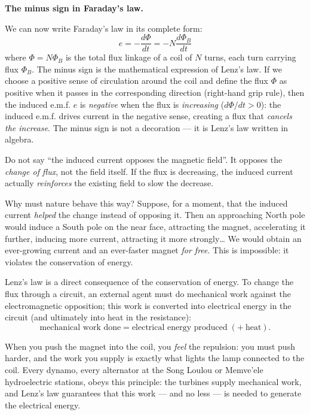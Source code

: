 \documentclass[11pt]{article}
\newcommand{\cle}[1]{{\popxbold\color{popdark}#1}}
\newcounter{popsec}
\newcounter{popsub}
\newcommand{\courssub}[1]{%
  \stepcounter{popsub}%
  \par\vspace{9pt}\noindent{\popxbold\fontsize{11.5}{13}\selectfont\color{popink}{\color{poporange}\thepopsec.\thepopsub}\hspace{6pt}#1}\par\nopagebreak\vspace{4pt}
}
\begin{document}
\textbf{The minus sign in Faraday's law.}\par

We can now write Faraday's law in its complete form:
\[
e = -\frac{d\Phi}{dt} = -N\frac{d\Phi_B}{dt}
\]
where $\Phi = N\Phi_B$ is the total flux linkage of a coil of $N$ turns, each turn carrying flux $\Phi_B$. The \cle{minus sign} is the mathematical expression of Lenz's law. If we choose a positive sense of circulation around the coil and define the flux $\Phi$ as positive when it passes in the corresponding direction (right-hand grip rule), then the induced e.m.f. $e$ is \emph{negative} when the flux is \emph{increasing} ($d\Phi/dt > 0$): the induced e.m.f. drives current in the negative sense, creating a flux that \emph{cancels the increase}. The minus sign is not a decoration --- it is Lenz's law written in algebra.

\begin{attention}
Do not say ``the induced current opposes the magnetic field''. It opposes the \emph{change of flux}, not the field itself. If the flux is decreasing, the induced current actually \emph{reinforces} the existing field to slow the decrease.
\end{attention}

\courssub{Lenz's Law and the Conservation of Energy}

Why must nature behave this way? Suppose, for a moment, that the induced current \emph{helped} the change instead of opposing it. Then an approaching North pole would induce a South pole on the near face, attracting the magnet, accelerating it further, inducing more current, attracting it more strongly\ldots{} We would obtain an ever-growing current and an ever-faster magnet \emph{for free}. This is impossible: it violates the \cle{conservation of energy}.

\begin{propriete}
Lenz's law is a direct consequence of the conservation of energy. To change the flux through a circuit, an external agent must do \cle{mechanical work} against the electromagnetic opposition; this work is converted into \cle{electrical energy} in the circuit (and ultimately into heat in the resistance):
\[
\text{mechanical work done} = \text{electrical energy produced} \; (+\ \text{heat}).
\]
\end{propriete}

When you push the magnet into the coil, you \emph{feel} the repulsion: you must push harder, and the work you supply is exactly what lights the lamp connected to the coil. Every dynamo, every alternator at the Song Loulou or Memve'ele hydroelectric stations, obeys this principle: the turbines supply mechanical work, and Lenz's law guarantees that this work --- and no less --- is needed to generate the electrical energy.
\end{document}
